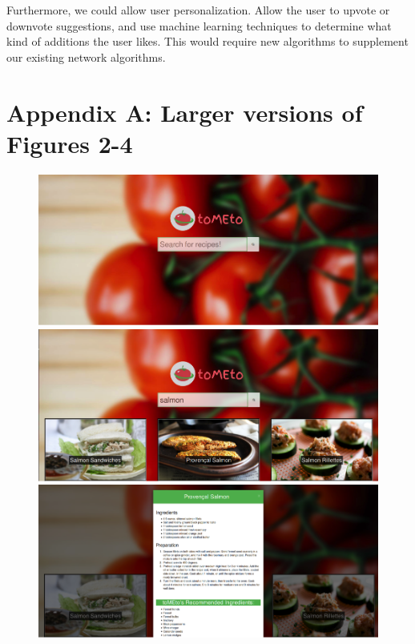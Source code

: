 \documentclass{acm_proc_article-sp}
\begin{document}
Furthermore, we could allow user personalization. Allow the user to upvote or downvote suggestions, and use machine learning techniques to determine what kind of additions the user likes. This would require new algorithms to supplement our existing network algorithms.


% 






\clearpage
\onecolumn
\section*{Appendix A: Larger versions of Figures 2-4}
\vspace{3mm} %

\begin{figure}[H]
\centering
\includegraphics[width=.95\textwidth]{p1.png}
\includegraphics[width=.95\textwidth]{p2.png}
\includegraphics[width=.95\textwidth]{p3.png}
\end{figure}
\end{document}
